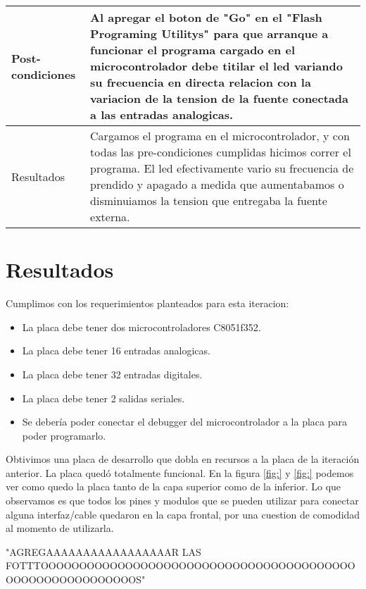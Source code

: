 \begin{table}[h]
\begin{tabular}{p{2cm} p{9cm}}
\hline

Post-condiciones &  Al apregar el boton de "Go" en el "Flash Programing Utilitys" para que arranque a funcionar el programa cargado en el microcontrolador debe titilar el led variando su frecuencia en directa relacion con la variacion de la tension de la fuente conectada a las entradas analogicas.
\\ 
\hline
Resultados       &  Cargamos el programa en el microcontrolador, y con todas las pre-condiciones cumplidas hicimos correr el programa. El led efectivamente vario su frecuencia de prendido y apagado a medida que aumentabamos o disminuiamos la tension que entregaba la fuente externa. \\                                                                                                            
\end{tabular}
\end{table}



\section{Resultados} %
\label{sec:resultados}

Cumplimos con los requerimientos planteados para esta iteracion:

\begin{itemize}
  \item La placa debe tener dos microcontroladores C8051f352.
  \item La placa debe tener 16 entradas analogicas.
  \item La placa debe tener 32 entradas digitales.
  \item La placa debe tener 2 salidas seriales. 
  \item Se debería poder conectar el debugger del microcontrolador a la placa para poder programarlo.
\end{itemize}


 Obtivimos una placa de desarrollo que dobla en recursos a la placa de la iteración anterior. La placa quedó totalmente funcional.
En la figura \ref{fig:} y \ref{fig:} podemos ver como quedo la placa tanto de la capa superior como de la inferior. Lo que observamos es que todos los pines y modulos que se pueden utilizar para conectar alguna interfaz/cable quedaron en la capa frontal, por una cuestion de comodidad al momento de utilizarla.

"AGREGAAAAAAAAAAAAAAAAAR LAS FOTTTOOOOOOOOOOOOOOOOOOOOOOOOOOOOOOOOOOOOOOOOOOOOOOOOOOOOOOOOOOS"


